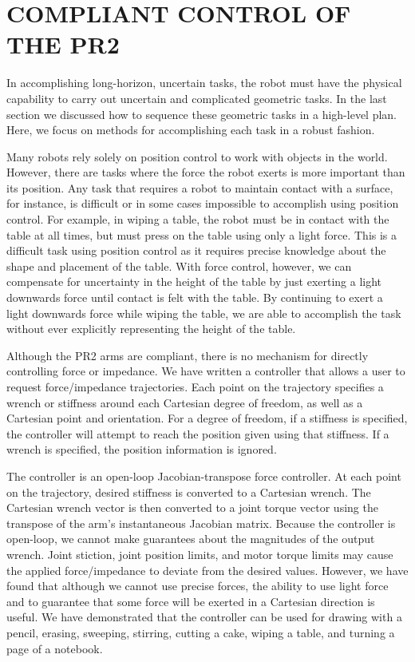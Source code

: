 \documentclass[letterpaper, 10 pt, conference]{ieeeconf}  %
\begin{document}
\section{COMPLIANT CONTROL OF THE PR2}

In accomplishing long-horizon, uncertain tasks, the robot must
have 
the physical capability to carry out uncertain and complicated
geometric tasks.  In the last section we discussed how to sequence
these geometric tasks in a high-level plan.  Here, we focus on methods
for accomplishing each task in a robust fashion.

Many robots rely solely on position control to work with objects in
the world.  However, there are tasks where the force the robot exerts
is more important than its position.  Any task that requires a robot
to maintain
contact with a surface, for instance, is difficult or in some cases
impossible to accomplish using position control.  For
example, in wiping a table, the robot must be in contact with the
table at all times, but must press on the table using only a light
force.
This is a difficult task using position control as it requires precise
knowledge about the shape and placement of the table.  With force
control, however, we can
compensate for uncertainty in the height of the table by
just exerting a light downwards force until contact is felt with the
table.  By continuing to exert a light downwards force while wiping
the table, we are able to accomplish the task without ever explicitly
representing the height of the table.

Although the PR2 arms are compliant, there is no mechanism for
directly controlling force or impedance.  We have
written a controller that allows a user to request 
force/impedance trajectories.  Each point on the trajectory specifies
a wrench or stiffness around each Cartesian degree of freedom, as well
as a Cartesian point and orientation.  For a degree of freedom, if a
stiffness is specified, the controller will attempt to reach the
position given using that stiffness.  If a wrench is specified, the
position information is ignored.

The controller is an open-loop Jacobian-transpose force controller.
At each point on the trajectory, desired stiffness is converted to
a Cartesian wrench.  The Cartesian wrench vector is
then converted to a joint torque vector using the transpose of the
arm's instantaneous Jacobian matrix.
Because the controller is open-loop, we cannot make guarantees about
the magnitudes of the output wrench.  Joint stiction, joint
position limits, and motor torque limits may cause
the applied 
force/impedance to deviate from the desired values.  However,
we have found that although we cannot use precise forces, the ability
to use light force and to guarantee that some force will be
exerted in a Cartesian direction is useful.  We have demonstrated that
the controller can be used for drawing with a pencil, erasing,
sweeping, stirring, cutting a cake, wiping a table, and turning a page
of a notebook.
\end{document}
